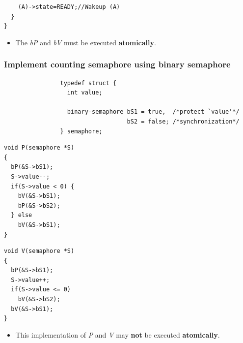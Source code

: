 \documentclass[CJKutf8,xcolor=pdftex,dvipsnames,table]{beamer}
\begin{document}
\begin{CJK*}{UTF8}{song}
\begin{frame}[fragile]
\begin{minipage}[c]{0.5\textwidth}
\begin{lstlisting}
    (A)->state=READY;//Wakeup (A)
  }
}
\end{lstlisting}

  \pause

  \end{minipage}

  \begin{itemize}
    \item{The \emph{bP} and \emph{bV} must be executed \textbf{atomically}.}
  \end{itemize}

\end{frame}

  \begin{frame}[fragile]
  \frametitle{Implement counting semaphore using binary semaphore} \pause

\begin{lstlisting}
                typedef struct {
                  int value;

                  binary-semaphore bS1 = true,  /*protect `value'*/
                                   bS2 = false; /*synchronization*/
                } semaphore;
\end{lstlisting}

  \pause
  \begin{minipage}[c]{0.5\textwidth}
\begin{lstlisting}
void P(semaphore *S)
{
  bP(&S->bS1);
  S->value--;
  if(S->value < 0) {
    bV(&S->bS1);
    bP(&S->bS2);
  } else
    bV(&S->bS1);
}
\end{lstlisting}
  \end{minipage}%
  \pause
  \begin{minipage}[c]{0.5\textwidth}
\begin{lstlisting}
void V(semaphore *S)
{
  bP(&S->bS1);
  S->value++;
  if(S->value <= 0)
    bV(&S->bS2);
  bV(&S->bS1);
}
\end{lstlisting}

  \end{minipage}

  \pause 

  \begin{itemize}
    \item{This implementation of \emph{P} and \emph{V} may \textbf{not} be executed \textbf{atomically}.}
  \end{itemize}

\end{frame}


\end{CJK*}
\end{document}
